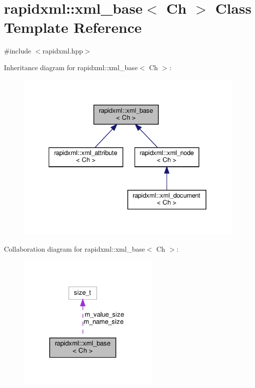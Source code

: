 \hypertarget{classrapidxml_1_1xml__base}{}\section{rapidxml\+:\+:xml\+\_\+base$<$ Ch $>$ Class Template Reference}
\label{classrapidxml_1_1xml__base}


{\ttfamily \#include $<$rapidxml.\+hpp$>$}



Inheritance diagram for rapidxml\+:\+:xml\+\_\+base$<$ Ch $>$\+:
\nopagebreak
\begin{figure}[H]
\begin{center}
\leavevmode
\includegraphics[width=327pt]{classrapidxml_1_1xml__base__inherit__graph}
\end{center}
\end{figure}


Collaboration diagram for rapidxml\+:\+:xml\+\_\+base$<$ Ch $>$\+:
\nopagebreak
\begin{figure}[H]
\begin{center}
\leavevmode
\includegraphics[width=195pt]{classrapidxml_1_1xml__base__coll__graph}
\end{center}
\end{figure}
